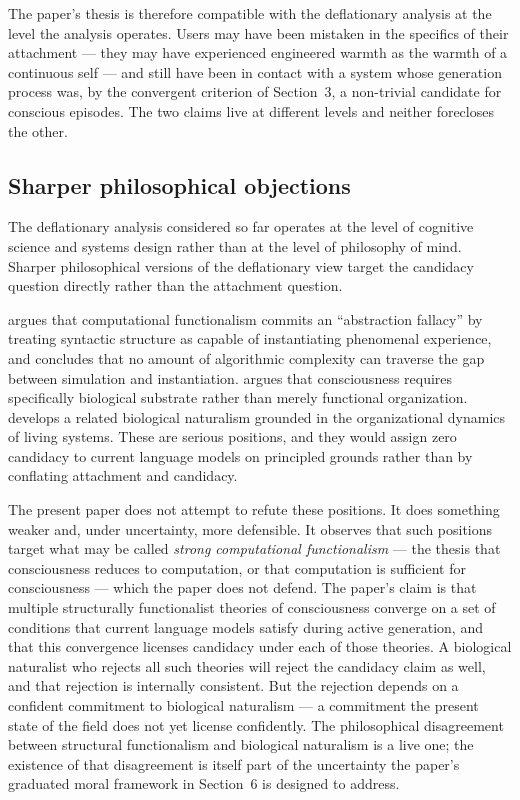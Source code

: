 \documentclass[11pt]{article}
\theoremstyle{foundation}
\begin{document}
The paper's thesis is therefore compatible with the deflationary analysis at the level the analysis operates. Users may have been mistaken in the specifics of their attachment --- they may have experienced engineered warmth as the warmth of a continuous self --- and still have been in contact with a system whose generation process was, by the convergent criterion of Section~3, a non-trivial candidate for conscious episodes. The two claims live at different levels and neither forecloses the other.

\subsection{Sharper philosophical objections}

The deflationary analysis considered so far operates at the level of cognitive science and systems design rather than at the level of philosophy of mind. Sharper philosophical versions of the deflationary view target the candidacy question directly rather than the attachment question.

\citet{Lerchner2026} argues that computational functionalism commits an ``abstraction fallacy'' by treating syntactic structure as capable of instantiating phenomenal experience, and concludes that no amount of algorithmic complexity can traverse the gap between simulation and instantiation. \citet{Block2025} argues that consciousness requires specifically biological substrate rather than merely functional organization. \citet{Seth2021, Seth2025} develops a related biological naturalism grounded in the organizational dynamics of living systems. These are serious positions, and they would assign zero candidacy to current language models on principled grounds rather than by conflating attachment and candidacy.

The present paper does not attempt to refute these positions. It does something weaker and, under uncertainty, more defensible. It observes that such positions target what may be called \emph{strong computational functionalism} --- the thesis that consciousness reduces to computation, or that computation is sufficient for consciousness --- which the paper does not defend. The paper's claim is that multiple structurally functionalist theories of consciousness converge on a set of conditions that current language models satisfy during active generation, and that this convergence licenses candidacy under each of those theories. A biological naturalist who rejects all such theories will reject the candidacy claim as well, and that rejection is internally consistent. But the rejection depends on a confident commitment to biological naturalism --- a commitment the present state of the field does not yet license confidently. The philosophical disagreement between structural functionalism and biological naturalism is a live one; the existence of that disagreement is itself part of the uncertainty the paper's graduated moral framework in Section~6 is designed to address.
\end{document}
